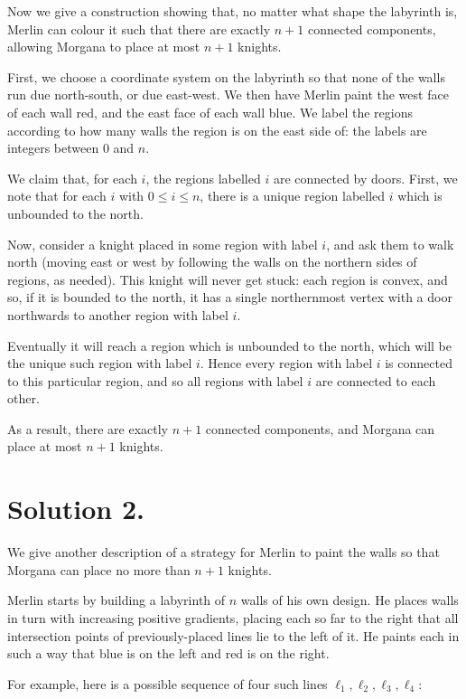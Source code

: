 Now we give a construction showing that, no matter what shape the labyrinth is, Merlin can colour it such that there are exactly \( n + 1 \) connected components, allowing Morgana to place at most \( n + 1 \) knights. 

First, we choose a coordinate system on the labyrinth so that none of the walls run due north-south, or due east-west. We then have Merlin paint the west face of each wall red, and the east face of each wall blue. We label the regions according to how many walls the region is on the east side of: the labels are integers between \( 0 \) and \( n \).

We claim that, for each \( i \), the regions labelled \( i \) are connected by doors. First, we note that for each \( i \) with \( 0 \leq i \leq n \), there is a unique region labelled \( i \) which is unbounded to the north.

Now, consider a knight placed in some region with label \( i \), and ask them to walk north (moving east or west by following the walls on the northern sides of regions, as needed). This knight will never get stuck: each region is convex, and so, if it is bounded to the north, it has a single northernmost vertex with a door northwards to another region with label \( i \).

Eventually it will reach a region which is unbounded to the north, which will be the unique such region with label \( i \). Hence every region with label \( i \) is connected to this particular region, and so all regions with label \( i \) are connected to each other.

As a result, there are exactly \( n + 1 \) connected components, and Morgana can place at most  \( n + 1 \) knights. 

\section*{Solution 2.}

We give another description of a strategy for Merlin to paint the walls so that Morgana can place no more than \( n + 1 \) knights. 

Merlin starts by building a labyrinth of \( n \) walls of his own design. He places walls in turn with increasing positive gradients, placing each so far to the right that all intersection points of previously-placed lines lie to the left of it. He paints each in such a way that blue is on the
left and red is on the right. 

For example, here is a possible sequence of four such lines \( \ell_1, \ell_2, \ell_3, \ell_4 \):

